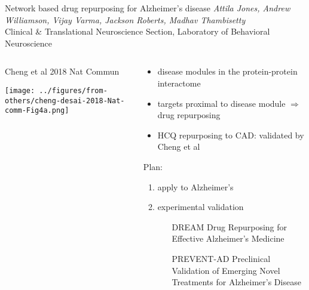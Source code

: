 \documentclass[aspectratio=169]{beamer}
\begin{document}
\begin{frame}{Network based drug repurposing for Alzheimer's disease}
	{\emph{Attila Jones, Andrew Williamson, Vijay Varma, Jackson Roberts, Madhav Thambisetty}\\
		Clinical \& Translational Neuroscience Section, Laboratory of Behavioral Neuroscience}
\begin{columns}[t]
\begin{column}{0.4\textwidth}
{\small Cheng et al 2018 Nat Commun}

\texttt{[image: ../figures/from-others/cheng-desai-2018-Nat-comm-Fig4a.png]}
\end{column}

\begin{column}{0.6\textwidth}
\begin{itemize}
\item disease modules in the protein-protein
	interactome
\item targets proximal to disease module $\Rightarrow$ drug repurposing
\item HCQ repurposing to CAD:
	validated by Cheng et al%
\end{itemize}
\vfill

\begin{center}
{\Large Plan:}
\end{center}

\begin{enumerate}
\item apply to Alzheimer's
\item experimental validation
\begin{itemize}
	\item[DREAM] {\tiny Drug Repurposing for Effective Alzheimer’s Medicine}
	\item[PREVENT-AD] {\tiny Preclinical Validation of Emerging Novel Treatments for Alzheimer's Disease}
\end{itemize}
\end{enumerate}
\end{column}
\end{columns}
\end{frame}
\end{document}
